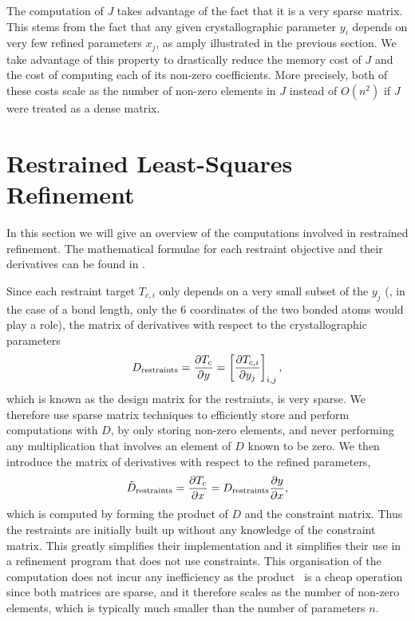 \documentclass[11pt]{article}
\newcommand{\partialder}[2]{\frac{\partial #1}{\partial #2}}
\begin{document}
The computation of $J$ takes advantage of the fact that it is a very sparse matrix. This stems from the fact that any given crystallographic parameter $y_i$ depends on very few refined parameters $x_j$, as amply illustrated in the previous section. We take advantage of this property to drastically reduce the memory cost of $J$ and the cost of computing each of its non-zero coefficients. More precisely, both of these costs scale as the number of non-zero elements in $J$ instead of $O(n^2)$ if $J$ were treated as a dense matrix.

\section{Restrained Least-Squares Refinement}
\label{sec:restraints}

In this section we will give an overview of the computations involved in restrained refinement. The mathematical formulae for each restraint objective and their derivatives can be found in .

Since each restraint target $T_{c,i}$ only depends on a very small subset of the $y_j$ (, in the case of a bond length, only the 6 coordinates of the two bonded atoms would play a role), the matrix of derivatives with respect to the crystallographic parameters
\begin{align}
D_\restraints = \partialder{T_c}{y} = \left[\partialder{T_{c,i}}{y_j}\right]_{i,j},
\end{align}
which is known as the design matrix for the restraints, is very sparse. We therefore use sparse matrix techniques to efficiently store and perform computations with $D$, by only storing non-zero elements, and never performing any multiplication that involves an element of $D$ known to be zero. We then introduce the matrix of derivatives with respect to the refined parameters,
\begin{align}
\tilde{D}_\restraints = \partialder{T_c}{x} = D_\restraints \partialder{y}{x},
\label{eqn:constraints:applied:torestraints}
\end{align}
which is computed by forming the product of $D$ and the constraint matrix. Thus the restraints are initially built up without any knowledge of the constraint matrix. This greatly simplifies their implementation and it simplifies their use in a refinement program that does not use constraints. This organisation of the computation does not incur any inefficiency as the product~ is a cheap operation since both matrices are sparse, and it therefore scales as the number of non-zero elements, which is typically much smaller than the number of parameters $n$. 
\end{document}
